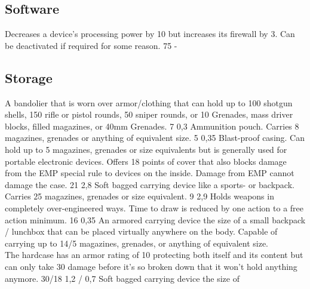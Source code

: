 \subsection{Software}
\vspace{10mm}
\begin{multicols}{2}
    {Decreases a device's processing power by 10 but increases its firewall by 3.
        Can be deactivated if required for some reason.}
    {75}
    {-}
\end{multicols}

\subsection{Storage}
\vspace{10mm}
\begin{multicols}{2}
    {A bandolier that is worn over armor/clothing that can hold up to
        100 shotgun shells,
        150 rifle or pistol rounds,
        50 sniper rounds,
        or 10 Grenades, mass driver blocks, filled magazines, or 40mm Grenades.}
    {7}
    {0,3}
    {Ammunition pouch.
        Carries 8 magazines, grenades or anything of equivalent size.}
    {5}
    {0,35}
    {Blast-proof casing.
        Can hold up to 5 magazines, grenades or size equivalents
        but is generally used for portable electronic devices.
        Offers 18 points of cover that also blocks damage from the EMP special rule to devices on the inside.
        Damage from EMP cannot damage the case.}
    {21}
    {2,8}
    {Soft bagged carrying device like a sports- or backpack.
        Carries 25 magazines, grenades or size equivalent.}
    {9}
    {2,9}
    {Holds weapons in completely over-engineered ways.
        Time to draw is reduced by one action to a free action minimum.}
    {16}
    {0,35}
    {An armored carrying device the size of
        a small backpack / lunchbox that can be placed virtually anywhere on the body.
        Capable of carrying up to 14/5 magazines, grenades, or anything of equivalent size.\\
        The hardcase has an armor rating of 10 protecting
        both itself and its content
        but can only take 30 damage before it's so broken down
        that it won't hold anything anymore.}
    {30/18}
    {1,2 / 0,7}
    {Soft bagged carrying device the size of
}
\end{multicols}
